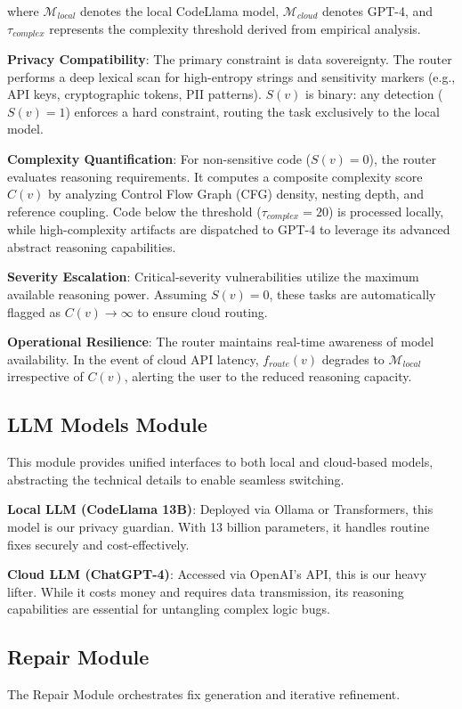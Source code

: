 \documentclass[conference]{IEEEtran}
\begin{document}
where $\mathcal{M}_{local}$ denotes the local CodeLlama model, $\mathcal{M}_{cloud}$ denotes GPT-4, and $\tau_{complex}$ represents the complexity threshold derived from empirical analysis.

\textbf{Privacy Compatibility}: The primary constraint is data sovereignty. The router performs a deep lexical scan for high-entropy strings and sensitivity markers (e.g., API keys, cryptographic tokens, PII patterns). $S(v)$ is binary: any detection ($S(v)=1$) enforces a hard constraint, routing the task exclusively to the local model.

\textbf{Complexity Quantification}: For non-sensitive code ($S(v)=0$), the router evaluates reasoning requirements. It computes a composite complexity score $C(v)$ by analyzing Control Flow Graph (CFG) density, nesting depth, and reference coupling. Code below the threshold ($\tau_{complex}=20$) is processed locally, while high-complexity artifacts are dispatched to GPT-4 to leverage its advanced abstract reasoning capabilities.

\textbf{Severity Escalation}: Critical-severity vulnerabilities utilize the maximum available reasoning power. Assuming $S(v)=0$, these tasks are automatically flagged as $C(v) \rightarrow \infty$ to ensure cloud routing.

\textbf{Operational Resilience}: The router maintains real-time awareness of model availability. In the event of cloud API latency, $f_{route}(v)$ degrades to $\mathcal{M}_{local}$ irrespective of $C(v)$, alerting the user to the reduced reasoning capacity.

\subsection{LLM Models Module}
This module provides unified interfaces to both local and cloud-based models, abstracting the technical details to enable seamless switching.

\textbf{Local LLM (CodeLlama 13B)}: Deployed via Ollama or Transformers, this model is our privacy guardian. With 13 billion parameters, it handles routine fixes securely and cost-effectively.

\textbf{Cloud LLM (ChatGPT-4)}: Accessed via OpenAI's API, this is our heavy lifter. While it costs money and requires data transmission, its reasoning capabilities are essential for untangling complex logic bugs.

\subsection{Repair Module}
The Repair Module orchestrates fix generation and iterative refinement.
\end{document}
